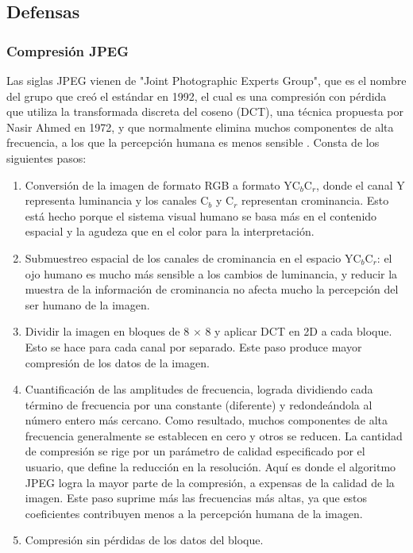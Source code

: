 \subsection{Defensas}

\subsubsection{Compresión JPEG}

Las siglas JPEG vienen de "Joint Photographic Experts Group", que es el nombre del grupo que creó el estándar en 1992, el cual es una compresión con pérdida que utiliza la transformada discreta del coseno (DCT), una técnica propuesta por Nasir Ahmed en 1972, y que normalmente elimina muchos componentes de alta frecuencia, a los que la percepción humana es menos sensible \cite{das2017keeping, shaham2018defending}. Consta de los siguientes pasos:
\begin{enumerate}
    \item Conversión de la imagen de formato RGB a formato YC$_b$C$_r$, donde el canal Y representa luminancia y los canales C$_b$ y C$_r$ representan crominancia. Esto está hecho porque el sistema visual humano se basa más en el contenido espacial y la agudeza que en el color para la interpretación.
    \item Submuestreo espacial de los canales de crominancia en el espacio YC$_b$C$_r$: el ojo humano es mucho más sensible a los cambios de luminancia, y reducir la muestra de la información de crominancia no afecta mucho la percepción del ser humano de la imagen.
    \item Dividir la imagen en bloques de 8 $\times$ 8 y aplicar DCT en 2D a cada bloque. Esto se hace para cada canal por separado. Este paso produce mayor compresión de los datos de la imagen.
    \item Cuantificación de las amplitudes de frecuencia, lograda dividiendo cada término de frecuencia por una constante (diferente) y redondeándola al número entero más cercano. Como resultado, muchos componentes de alta frecuencia generalmente se establecen en cero y otros se reducen. La cantidad de compresión se rige por un parámetro de calidad especificado por el usuario, que define la reducción en la resolución. Aquí es donde el algoritmo JPEG logra la mayor parte de la compresión, a expensas de la calidad de la imagen. Este paso suprime más las frecuencias más altas, ya que estos coeficientes contribuyen menos a la percepción humana de la imagen.
    \item Compresión sin pérdidas de los datos del bloque.
\end{enumerate}

